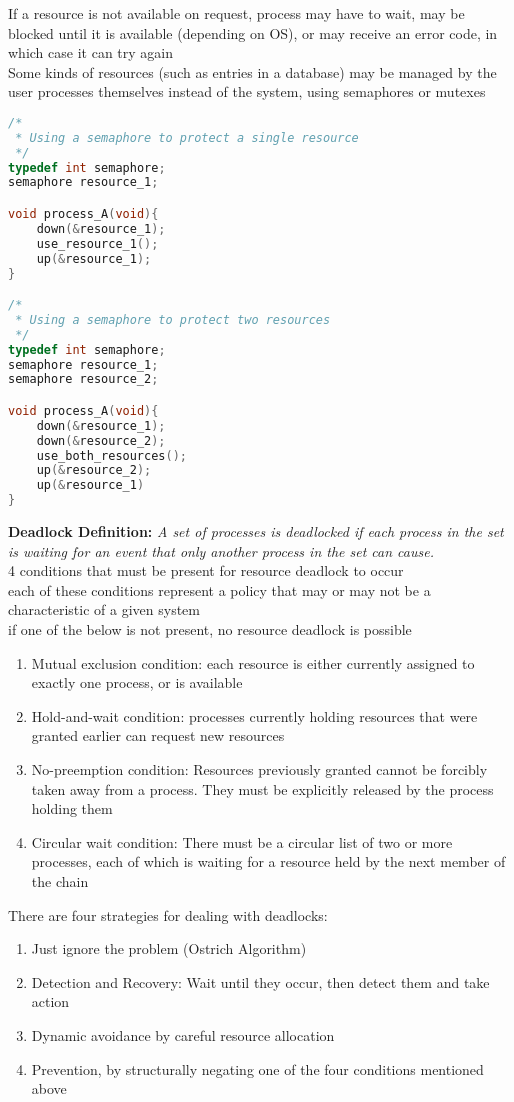 \documentclass{article}
\begin{document}
If a resource is not available on request, process may have to wait, may be blocked until it is available (depending on OS), or may receive an error code, in which case it can try again
\\Some kinds of resources (such as entries in a database) may be managed by the user processes themselves instead of the system, using semaphores or mutexes
\begin{lstlisting}[language=C]
/*
 * Using a semaphore to protect a single resource
 */
typedef int semaphore;
semaphore resource_1;

void process_A(void){
	down(&resource_1);
	use_resource_1();
	up(&resource_1);
}

/*
 * Using a semaphore to protect two resources
 */
typedef int semaphore;
semaphore resource_1;
semaphore resource_2;

void process_A(void){
	down(&resource_1);
	down(&resource_2);
	use_both_resources();
	up(&resource_2);
	up(&resource_1)
}
\end{lstlisting}
\textbf{Deadlock Definition:} \textit{A set of processes is deadlocked if each process in the set is waiting for an event that only another process in the set can cause.} 
\\4 conditions that must be present for resource deadlock to occur
\\each of these conditions represent a policy that may or may not be a characteristic of a given system
\\if one of the below is not present, no resource deadlock is possible
\begin{enumerate}
	\item Mutual exclusion condition: each resource is either currently assigned to exactly one process, or is available
	\item Hold-and-wait condition: processes currently holding resources that were granted earlier can request new resources
	\item No-preemption condition: Resources previously granted cannot be forcibly taken away from a process. They must be explicitly released by the process holding them
	\item Circular wait condition: There must be a circular list of two or more processes, each of which is waiting for a resource held by the next member of the chain
\end{enumerate}
There are four strategies for dealing with deadlocks:
\begin{enumerate}
	\item Just ignore the problem (Ostrich Algorithm)
	\item Detection and Recovery: Wait until they occur, then detect them and take action
	\item Dynamic avoidance by careful resource allocation
	\item Prevention, by structurally negating one of the four conditions mentioned above
\end{enumerate}
\end{document}
